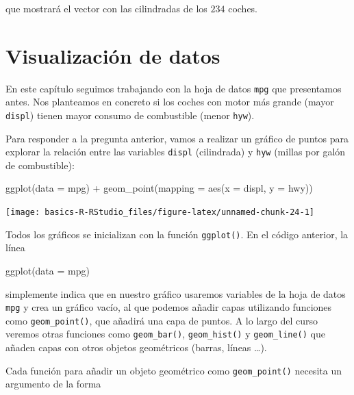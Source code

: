 \documentclass[
  title=normal,
  notoc,
  bib=normal]{mnye}
\newenvironment{Shaded}{\begin{snugshade}}{\end{snugshade}}
\newcommand{\AttributeTok}[1]{\textcolor[rgb]{0.77,0.63,0.00}{#1}}
\newcommand{\FunctionTok}[1]{\textcolor[rgb]{0.00,0.00,0.00}{#1}}
\newcommand{\NormalTok}[1]{#1}
\newcommand{\SpecialCharTok}[1]{\textcolor[rgb]{0.00,0.00,0.00}{#1}}
\begin{document}
que mostrará el vector con las cilindradas de los \(234\) coches.

\hypertarget{plots}{%
\section{Visualización de datos}\label{plots}}

En este capítulo seguimos trabajando con la hoja de datos \texttt{mpg} que presentamos antes.
Nos planteamos en concreto si los coches con motor más grande (mayor \texttt{displ}) tienen mayor consumo de combustible (menor \texttt{hyw}).

Para responder a la pregunta anterior, vamos a realizar un gráfico de puntos para explorar la relación entre las variables \texttt{displ} (cilindrada) y \texttt{hyw} (millas por galón de combustible):

\begin{Shaded}
\begin{Highlighting}[]
\FunctionTok{ggplot}\NormalTok{(}\AttributeTok{data =}\NormalTok{ mpg) }\SpecialCharTok{+} 
    \FunctionTok{geom\_point}\NormalTok{(}\AttributeTok{mapping =} \FunctionTok{aes}\NormalTok{(}\AttributeTok{x =}\NormalTok{ displ, }\AttributeTok{y =}\NormalTok{ hwy)) }
\end{Highlighting}
\end{Shaded}

\begin{center}\texttt{[image: basics-R-RStudio\_files/figure-latex/unnamed-chunk-24-1]} \end{center}

Todos los gráficos se inicializan con la función \texttt{ggplot()}. En el código anterior, la línea

\begin{Shaded}
\begin{Highlighting}[]
\FunctionTok{ggplot}\NormalTok{(}\AttributeTok{data =}\NormalTok{ mpg)}
\end{Highlighting}
\end{Shaded}

simplemente indica que en nuestro gráfico usaremos variables de la hoja de datos \texttt{mpg} y crea un gráfico vacío, al que podemos añadir capas utilizando funciones como \texttt{geom\_point()}, que añadirá una capa de puntos. A lo largo del curso veremos otras funciones como \texttt{geom\_bar()}, \texttt{geom\_hist()} y \texttt{geom\_line()} que añaden capas con otros objetos geométricos (barras, líneas \ldots).

Cada función para añadir un objeto geométrico como \texttt{geom\_point()} necesita un argumento de la forma
\end{document}
